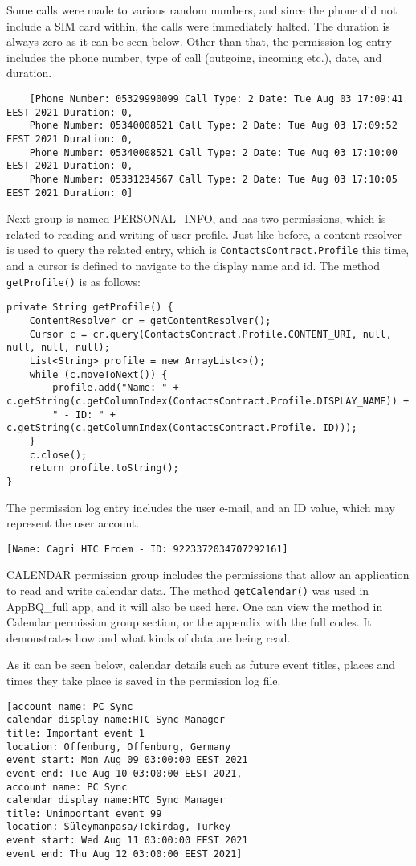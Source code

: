 \documentclass[
  a4paper,  %
  twoside,  %
  bibliography=totoc,
  headsepline,
  cleardoublepage=empty,
  parskip=half,
  draft=false,
  open=any
]{scrbook}
\begin{document}
Some calls were made to various random numbers, and since the phone did not include a SIM card within, the calls were immediately halted. The duration is always zero as it can be seen below. Other than that, the permission log entry includes the phone number, type of call (outgoing, incoming etc.), date, and duration.
\begin{lstlisting}
	[Phone Number: 05329990099 Call Type: 2 Date: Tue Aug 03 17:09:41 EEST 2021 Duration: 0, 
	Phone Number: 05340008521 Call Type: 2 Date: Tue Aug 03 17:09:52 EEST 2021 Duration: 0, 
	Phone Number: 05340008521 Call Type: 2 Date: Tue Aug 03 17:10:00 EEST 2021 Duration: 0, 
	Phone Number: 05331234567 Call Type: 2 Date: Tue Aug 03 17:10:05 EEST 2021 Duration: 0]
\end{lstlisting}

Next group is named PERSONAL\_INFO, and has two permissions, which is related to reading and writing of user profile. Just like before, a content resolver is used to query the related entry, which is \texttt{ContactsContract.Profile} this time, and a cursor is defined to navigate to the display name and id. The method \texttt{getProfile()} is as follows:
\begin{lstlisting}
private String getProfile() {
	ContentResolver cr = getContentResolver();
	Cursor c = cr.query(ContactsContract.Profile.CONTENT_URI, null, null, null, null);
	List<String> profile = new ArrayList<>();
	while (c.moveToNext()) {
		profile.add("Name: " + c.getString(c.getColumnIndex(ContactsContract.Profile.DISPLAY_NAME)) +
		" - ID: " + c.getString(c.getColumnIndex(ContactsContract.Profile._ID)));
	}
	c.close();
	return profile.toString();
}
\end{lstlisting}
The permission log entry includes the user e-mail, and an ID value, which may represent the user account.
\begin{lstlisting}
[Name: Cagri HTC Erdem - ID: 9223372034707292161]
\end{lstlisting}

CALENDAR permission group includes the permissions that allow an application to read and write calendar data. The method \texttt{getCalendar()} was used in AppBQ\_full app, and it will also be used here. One can view the method in Calendar permission group section, or the appendix with the full codes. It demonstrates how and what kinds of data are being read.

As it can be seen below, calendar details such as future event titles, places and times they take place is saved in the permission log file.
\begin{lstlisting}
[account name: PC Sync
calendar display name:HTC Sync Manager
title: Important event 1
location: Offenburg, Offenburg, Germany
event start: Mon Aug 09 03:00:00 EEST 2021
event end: Tue Aug 10 03:00:00 EEST 2021, 
account name: PC Sync
calendar display name:HTC Sync Manager
title: Unimportant event 99
location: Süleymanpasa/Tekirdag, Turkey
event start: Wed Aug 11 03:00:00 EEST 2021
event end: Thu Aug 12 03:00:00 EEST 2021]
\end{lstlisting}
\end{document}
